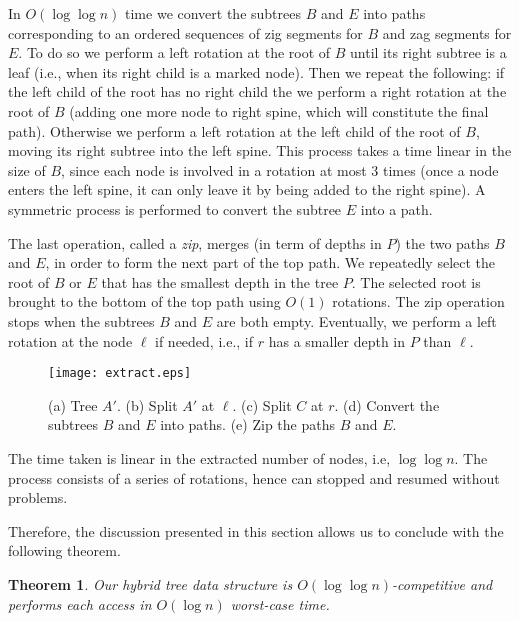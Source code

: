 \documentclass[letterpaper,11pt]{article}
\newtheorem{thm}{Theorem}
\newcommand{\toppath}{top path}
\begin{document}
In $O(\log \log n)$ time we convert the subtrees $B$ and $E$ into paths
corresponding to an ordered sequences of zig segments for $B$ and zag
segments for $E$. To do so we perform a left rotation at the root of $B$
until its right subtree is a leaf (i.e., when its right child is a marked
node). Then we repeat the following: if the left child of the root has no
right child the we perform a right rotation at the root of $B$ (adding one
more node to right spine, which will constitute the final path). Otherwise
we perform a left rotation at the left child of the root of $B$, moving its
right subtree into the left spine. This process takes a time linear in the
size of $B$, since each node is involved in a rotation at most 3 times
(once a node enters the left spine, it can only leave it by being added to
the right spine). A symmetric process is performed to convert the subtree
$E$ into a path.

The last operation, called a \emph{zip}, merges (in term of depths in $P$)
the two paths $B$ and $E$, in order to form the next part of the
\toppath. We repeatedly select the root of $B$ or $E$ that has the smallest
depth in the tree $P$. The selected root is brought to the bottom of the
\toppath{} using $O(1)$ rotations. The zip operation stops when the subtrees
$B$ and $E$ are both empty. Eventually, we perform a left rotation at the
node $\ell$ if needed, i.e., if $r$ has a smaller depth in $P$ than $\ell$.

\begin{figure}\begin{center}
        \texttt{[image: extract.eps]}
    \end{center}
    \caption{\label{fig-extract} (a) Tree $A'$. (b) Split $A'$ at $\ell$. (c) Split $C$ at $r$. (d) Convert the subtrees $B$ and $E$ into paths. (e) Zip the paths $B$ and $E$.}
\end{figure}

The time taken is linear in the extracted number of nodes, i.e, $\log \log
n$. The process consists of a series of rotations, hence can stopped and
resumed without problems. 

Therefore, the discussion presented in this section allows us to conclude with
the following theorem.


\begin{thm}
Our hybrid tree data structure is $O(\log \log n)$-competitive and performs
each access in $O(\log n)$ worst-case time.
\end{thm}
\end{document}
